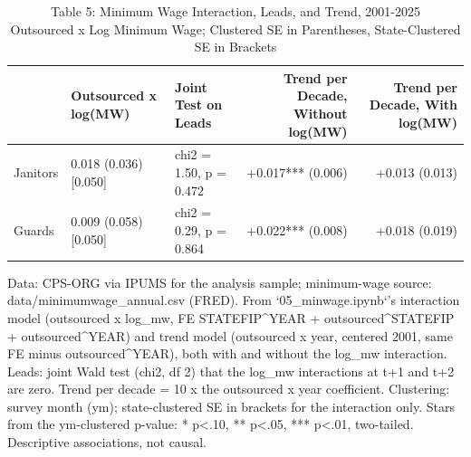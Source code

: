 \begin{table}[!t]
\caption*{
{\large Table 5: Minimum Wage Interaction, Leads, and Trend, 2001-2025} \\
{\small Outsourced x Log Minimum Wage; Clustered SE in Parentheses, State-Clustered SE in Brackets}
} 

\fontsize{10.0pt}{12.0pt}\selectfont

\centering\begin{tabular}{l|llrr}
\toprule
  & Outsourced x log(MW) & Joint Test on Leads & Trend per Decade, Without log(MW) & Trend per Decade, With log(MW) \\ 
\midrule\addlinespace[2.5pt]
Janitors & 0.018 (0.036) [0.050] & chi2 = 1.50, p = 0.472 & +0.017*** (0.006) & +0.013 (0.013) \\
Guards & 0.009 (0.058) [0.050] & chi2 = 0.29, p = 0.864 & +0.022*** (0.008) & +0.018 (0.019) \\
\bottomrule
\end{tabular}\par\raggedright
\begin{minipage}{\linewidth}
Data: CPS-ORG via IPUMS for the analysis sample; minimum-wage source: data/minimumwage\_annual.csv (FRED). From `05\_minwage.ipynb`'s interaction model (outsourced x log\_mw, FE STATEFIP\textasciicircum{}YEAR + outsourced\textasciicircum{}STATEFIP + outsourced\textasciicircum{}YEAR) and trend model (outsourced x year, centered 2001, same FE minus outsourced\textasciicircum{}YEAR), both with and without the log\_mw interaction. Leads: joint Wald test (chi2, df 2) that the log\_mw interactions at t+1 and t+2 are zero. Trend per decade = 10 x the outsourced x year coefficient. Clustering: survey month (ym); state-clustered SE in brackets for the interaction only. Stars from the ym-clustered p-value: * p<.10, ** p<.05, *** p<.01, two-tailed. Descriptive associations, not causal.\\
\end{minipage}
\end{table}
